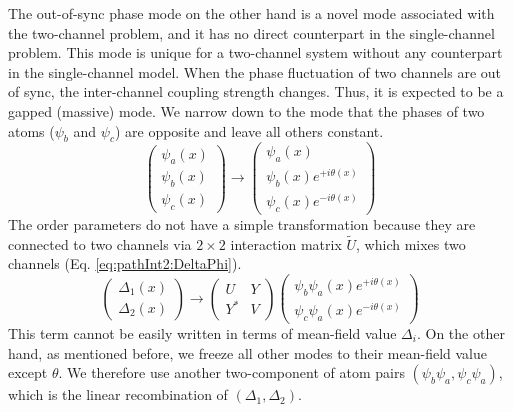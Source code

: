 \documentclass[reprint,pra]{revtex4-1}
\newcommand{\mtrx}[1]{\ensuremath{\begin{pmatrix}#1\end{pmatrix}}}
\newcommand{\av}[1]{\ensuremath{\bigl<{#1}\bigr>}}
\begin{document}
The out-of-sync phase mode on the other hand is a novel mode associated with the two-channel problem, and it has no direct counterpart in the single-channel problem.  
 This mode is unique for a two-channel system without any counterpart in the single-channel model.  When  the phase fluctuation of two channels are out of  sync,  the inter-channel coupling strength changes.  Thus, it is  expected to be  a gapped (massive) mode.  We narrow down to the mode that the phases of two atoms  ($\psi_{b}$ and $\psi_{c}$) are opposite and leave all others constant.  
\begin{equation*}
\mtrx{\psi_{a}(x)\\\psi_{b}(x)\\\psi_{c}(x)}\rightarrow{}
	\mtrx{\psi_{a}(x)\\\psi_{b}(x)e^{+i\theta(x)}\\\psi_{c}(x)e^{-i\theta(x)}}
\end{equation*}
The order parameters do not have a simple transformation because they are connected to two channels via $2\times2$ interaction matrix $\tilde{U}$, which mixes two channels (Eq. \ref{eq:pathInt2:DeltaPhi}).  
\begin{equation*}
\begin{pmatrix}\Delta_{1}(x)\\\Delta_{2}(x)\end{pmatrix}\rightarrow{}
	\mtrx{U&Y\\Y^{*}&V}\begin{pmatrix}\psi_{b}\psi_{a}(x)e^{+i\theta(x)}\\\psi_{c}\psi_{a}(x)e^{-i\theta(x)}\end{pmatrix}
\end{equation*}
This term cannot be easily written in terms of mean-field value $\Delta_i$.   On the other hand, as mentioned before, we freeze all  other modes to their mean-field value except $\theta$.  We therefore use another two-component of atom pairs $({\psi_{b}\psi_{a}},{\psi_{c}\psi_{a}})$, which is the linear recombination of $(\Delta_{1},\Delta_{2})$.  
 
\end{document}
